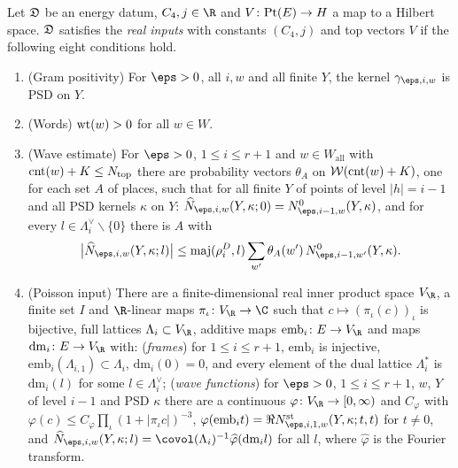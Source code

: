 \begin{definition}\label{pf:thmS-carrier:realinputs}
Let $\mathfrak{D}$ be an energy datum, $C_4,j\in\R$ and $V\colon\mathrm{Pt}(E)\to H$ a map to a Hilbert space.
$\mathfrak{D}$ satisfies the \emph{real inputs} with constants $(C_4,j)$ and top vectors $V$ if the following eight
conditions hold.
\begin{enumerate}[label=(R\arabic*)]
\item\label{pf:thmS-carrier:R1} (Gram positivity) For $\eps>0$, all $i,w$ and all finite $Y$, the kernel
  $\gamma_{\eps,i,w}$ is PSD on $Y$.
\item\label{pf:thmS-carrier:R2} (Words) $\operatorname{wt}(w)>0$ for all $w\in W$.
\item\label{pf:thmS-carrier:R3} (Wave estimate) For $\eps>0$, $1\le i\le r+1$ and $w\in W_{\mathrm{all}}$ with
  $\operatorname{cnt}(w)+K\le N_{\mathrm{top}}$ there are probability vectors $\theta_A$ on
  $\mathcal{W}(\operatorname{cnt}(w)+K)$, one for each set $A$ of places, such that for all finite $Y$ of points of
  level $|h|=i-1$ and all PSD kernels $\kappa$ on $Y$:
  $\thmScarrierNhat_{\eps,i,w}(Y,\kappa;0)=\thmScarrierNz_{\eps,i-1,w}(Y,\kappa)$, and for every
  $l\in\Lambda^\vee_i\smallsetminus\{0\}$ there is $A$ with
  \[
  \bigl|\thmScarrierNhat_{\eps,i,w}(Y,\kappa;l)\bigr|\le\thmScarrierMaj(\rho^D_i,l)\sum_{w'}\theta_A(w')\,
  \thmScarrierNz_{\eps,i-1,w'}(Y,\kappa).
  \]
\item\label{pf:thmS-carrier:R4} (Poisson input) There are a finite-dimensional real inner product space $V_\R$, a finite
  set $I$ and $\R$-linear maps $\pi_\iota\colon V_\R\to\C$ such that $c\mapsto(\pi_\iota(c))_\iota$ is bijective, full
  lattices $\Lambda_i\subset V_\R$, additive maps $\mathrm{emb}_i\colon E\to V_\R$ and maps $\mathrm{dm}_i\colon E\to
  V_\R$ with:
  (\emph{frames}) for $1\le i\le r+1$, $\mathrm{emb}_i$ is injective, $\mathrm{emb}_i(\Lambda_{i,1})\subset\Lambda_i$,
  $\mathrm{dm}_i(0)=0$, and every element of the dual lattice $\Lambda_i^*$ is $\mathrm{dm}_i(l)$ for some
  $l\in\Lambda^\vee_i$;
  (\emph{wave functions}) for $\eps>0$, $1\le i\le r+1$, $w$, $Y$ of level $i-1$ and PSD $\kappa$ there are a continuous
  $\varphi\colon V_\R\to[0,\infty)$ and $C_\varphi$ with $\varphi(c)\le C_\varphi\prod_\iota(1+|\pi_\iota c|)^{-3}$,
  $\varphi(\mathrm{emb}_i t)=\Re\thmScarrierNst_{\eps,i,1,w}(Y,\kappa;t,t)$ for $t\ne0$, and
  $\thmScarrierNhat_{\eps,i,w}(Y,\kappa;l)=\covol(\Lambda_i)^{-1}\widehat\varphi(\mathrm{dm}_i l)$ for all $l$, where
  $\widehat\varphi$ is the Fourier transform.

\end{enumerate}
\end{definition}
